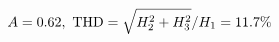 \documentclass[preview]{standalone}
\begin{document}
\begin{align*}
\special{dvisvgm:raw <g id='unique000'>}A=0.62,\ \text{THD}=\sqrt{H_2^2+H_3^2}/H_1=11.7\%\special{dvisvgm:raw </g>}
\end{align*}
\end{document}
